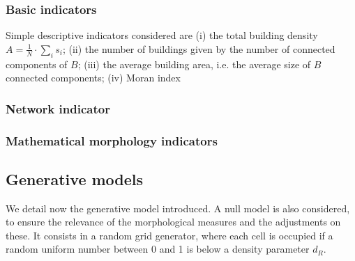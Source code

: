 \documentclass[letterpaper]{article}
\begin{document}
\subsubsection{Basic indicators}
Simple descriptive indicators considered are (i) the total building density $A = \frac{1}{N}\cdot \sum_i s_i$; (ii) the number of buildings given by the number of connected components of $B$; (iii) the average building area, i.e. the average size of $B$ connected components; (iv) Moran index


\subsubsection{Network indicator}


\subsubsection{Mathematical morphology indicators}














\subsection{Generative models}

We detail now the generative model introduced. A null model is also considered, to ensure the relevance of the morphological measures and the adjustments on these. It consists in a random grid generator, where each cell is occupied if a random uniform number between 0 and 1 is below a density parameter $d_R$.
\end{document}
